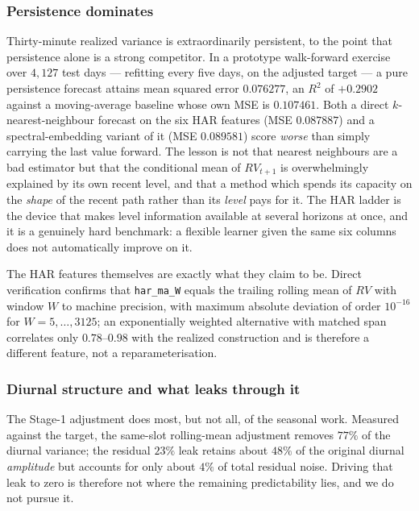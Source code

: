 \subsubsection{Persistence dominates}

Thirty-minute realized variance is extraordinarily persistent, to the point that
persistence alone is a strong competitor. In a prototype walk-forward exercise
over $4{,}127$ test days --- refitting every five days, on the adjusted target
--- a pure persistence forecast attains mean squared error $0.076277$, an
$R^2$ of $+0.2902$ against a moving-average baseline whose own MSE is
$0.107461$. Both a direct $k$-nearest-neighbour forecast on the six HAR features
(MSE $0.087887$) and a spectral-embedding variant of it (MSE $0.089581$) score
\emph{worse} than simply carrying the last value forward.
The lesson is not that nearest neighbours are a bad estimator but that the
conditional mean of $RV_{t+1}$ is overwhelmingly explained by its own recent
level, and that a method which spends its capacity on the \emph{shape} of the
recent path rather than its \emph{level} pays for it. The HAR ladder is the
device that makes level information available at several horizons at once, and
it is a genuinely hard benchmark: a flexible learner given the same six columns
does not automatically improve on it.

The HAR features themselves are exactly what they claim to be. Direct
verification confirms that \texttt{har\_ma\_W} equals the trailing rolling mean
of $RV$ with window $W$ to machine precision, with maximum absolute deviation of
order $10^{-16}$ for $W = 5,\dots,3125$; an exponentially weighted alternative
with matched span correlates only $0.78$--$0.98$ with the realized construction
and is therefore a different feature, not a reparameterisation.

\subsubsection{Diurnal structure and what leaks through it}

The Stage-1 adjustment does most, but not all, of the seasonal work. Measured
against the target, the same-slot rolling-mean adjustment removes $77\%$ of the
diurnal variance; the residual $23\%$ leak retains about $48\%$ of the original
diurnal \emph{amplitude} but accounts for only about $4\%$ of total residual
noise.
Driving that leak to zero is therefore not where the remaining predictability
lies, and we do not pursue it.


